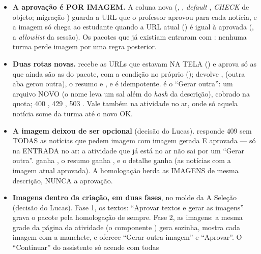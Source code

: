 \begin{itemize}
  \item \textbf{A aprovação é POR IMAGEM.} A coluna nova
     (, ,
    \emph{default} , \emph{CHECK} de objeto; migração
    ) guarda a URL que o
    professor aprovou para cada notícia, e a imagem só chega ao estudante
    quando a URL atual () é igual à aprovada (,
    a \emph{allowlist} da sessão). Os pacotes que já existiam entraram com
    : nenhuma turma perde imagem por uma regra
    posterior.
  \item \textbf{Duas rotas novas.}  recebe as URLs que estavam NA TELA
    () e aprova só as que ainda são as do pacote,
    com a condição no próprio  (); devolve
    ,  (outra aba gerou outra), o resumo
     e , e é idempotente.  é o \enquote{Gerar
    outra}: um arquivo NOVO (o nome leva um sal além do \emph{hash} da
    descrição), cobrado na quota; 400 , 429
    , 503 . Vale também na atividade no
    ar, onde só aquela notícia some da turma até o novo OK.
  \item \textbf{A imagem deixou de ser opcional} (decisão do Lucas).
     responde 409  sem
    TODAS as notícias que pedem imagem com imagem gerada E aprovada --- só na
    ENTRADA no ar: a atividade que já está no ar não sai por um \enquote{Gerar
    outra}.  ganha , o
    resumo  ganha , e o detalhe ganha 
    (as notícias com a imagem atual aprovada). A homologação herda as IMAGENS
    de mesma descrição, NUNCA a aprovação.
  \item \textbf{Imagens dentro da criação, em duas fases}, no molde da A
    Seleção (decisão do Lucas). Fase 1, os textos: \enquote{Aprovar textos e
    gerar as imagens} grava o pacote pela homologação de sempre. Fase 2, as
    imagens: a mesma grade da página da atividade (o componente
    ) gera sozinha, mostra cada imagem
    com a manchete, e oferece \enquote{Gerar outra imagem} e
    \enquote{Aprovar}. O \enquote{Continuar} do assistente só acende com todas

\end{itemize}
